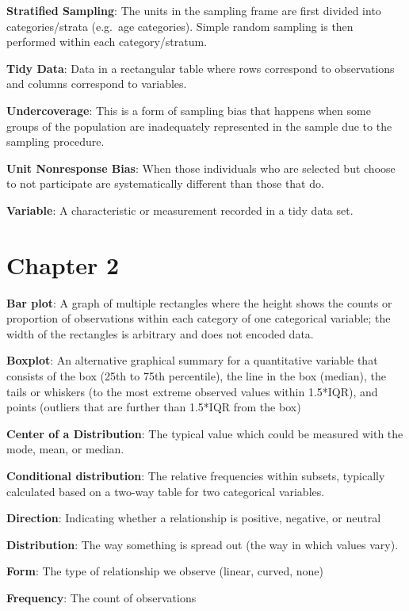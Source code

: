 \documentclass[]{book}
\begin{document}
\textbf{Stratified Sampling}: The units in the sampling frame are first divided into categories/strata (e.g.~age categories). Simple random sampling is then performed within each category/stratum.

\textbf{Tidy Data}: Data in a rectangular table where rows correspond to observations and columns correspond to variables.

\textbf{Undercoverage}: This is a form of sampling bias that happens when some groups of the population are inadequately represented in the sample due to the sampling procedure.

\textbf{Unit Nonresponse Bias}: When those individuals who are selected but choose to not participate are systematically different than those that do.

\textbf{Variable}: A characteristic or measurement recorded in a tidy data set.

\hypertarget{chapter-2}{%
\section{Chapter 2}\label{chapter-2}}

\textbf{Bar plot}: A graph of multiple rectangles where the height shows the counts or proportion of observations within each category of one categorical variable; the width of the rectangles is arbitrary and does not encoded data.

\textbf{Boxplot}: An alternative graphical summary for a quantitative variable that consists of the box (25th to 75th percentile), the line in the box (median), the tails or whiskers (to the most extreme observed values within 1.5*IQR), and points (outliers that are further than 1.5*IQR from the box)

\textbf{Center of a Distribution}: The typical value which could be measured with the mode, mean, or median.

\textbf{Conditional distribution}: The relative frequencies within subsets, typically calculated based on a two-way table for two categorical variables.

\textbf{Direction}: Indicating whether a relationship is positive, negative, or neutral

\textbf{Distribution}: The way something is spread out (the way in which values vary).

\textbf{Form}: The type of relationship we observe (linear, curved, none)

\textbf{Frequency}: The count of observations
\end{document}
